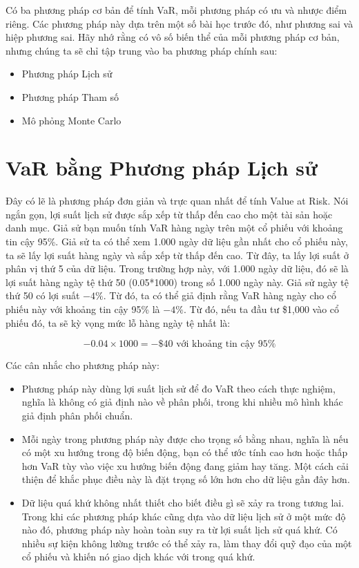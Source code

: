 Có ba phương pháp cơ bản để tính VaR, mỗi phương pháp có ưu và nhược điểm riêng. Các phương pháp này dựa trên một số bài học trước đó, như phương sai và hiệp phương sai. Hãy nhớ rằng có vô số biến thể của mỗi phương pháp cơ bản, nhưng chúng ta sẽ chỉ tập trung vào ba phương pháp chính sau:

\begin{itemize}
  \item Phương pháp Lịch sử
  \item Phương pháp Tham số
  \item Mô phỏng Monte Carlo
\end{itemize}

\section{VaR bằng Phương pháp Lịch sử}

Đây có lẽ là phương pháp đơn giản và trực quan nhất để tính Value at Risk. Nói ngắn gọn, lợi suất lịch sử được sắp xếp từ thấp đến cao cho một tài sản hoặc danh mục. Giả sử bạn muốn tính VaR hàng ngày trên một cổ phiếu với khoảng tin cậy 95\%. Giả sử ta có thể xem 1.000 ngày dữ liệu gần nhất cho cổ phiếu này, ta sẽ lấy lợi suất hàng ngày và sắp xếp từ thấp đến cao. Từ đây, ta lấy lợi suất ở phân vị thứ 5 của dữ liệu. Trong trường hợp này, với 1.000 ngày dữ liệu, đó sẽ là lợi suất hàng ngày tệ thứ 50 (0.05*1000) trong số 1.000 ngày này. Giả sử ngày tệ thứ 50 có lợi suất $-4\%$. Từ đó, ta có thể giả định rằng VaR hàng ngày cho cổ phiếu này với khoảng tin cậy 95\% là $-4\%$. Từ đó, nếu ta đầu tư \$1,000 vào cổ phiếu đó, ta sẽ kỳ vọng mức lỗ hàng ngày tệ nhất là:

$$
-0.04 \times 1000 = -\$40 \text{ với khoảng tin cậy 95\%}
$$

Các cân nhắc cho phương pháp này:

\begin{itemize}
  \item Phương pháp này dùng lợi suất lịch sử để đo VaR theo cách thực nghiệm, nghĩa là không có giả định nào về phân phối, trong khi nhiều mô hình khác giả định phân phối chuẩn.
  \item Mỗi ngày trong phương pháp này được cho trọng số bằng nhau, nghĩa là nếu có một xu hướng trong độ biến động, bạn có thể ước tính cao hơn hoặc thấp hơn VaR tùy vào việc xu hướng biến động đang giảm hay tăng. Một cách cải thiện để khắc phục điều này là đặt trọng số lớn hơn cho dữ liệu gần đây hơn.
  \item Dữ liệu quá khứ không nhất thiết cho biết điều gì sẽ xảy ra trong tương lai. Trong khi các phương pháp khác cũng dựa vào dữ liệu lịch sử ở một mức độ nào đó, phương pháp này hoàn toàn suy ra từ lợi suất lịch sử quá khứ. Có nhiều sự kiện không lường trước có thể xảy ra, làm thay đổi quỹ đạo của một cổ phiếu và khiến nó giao dịch khác với trong quá khứ.
\end{itemize}

